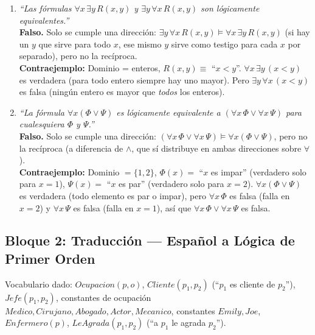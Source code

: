 \begin{enumerate}
    \item \textit{``Las fórmulas $\forall x\, \exists y\, R(x,y)$ y $\exists y\, \forall x\, R(x,y)$
    son lógicamente equivalentes.''}\\
    \textbf{Falso.} Solo se cumple una dirección: $\exists y\,\forall x\,R(x,y) \models \forall x\,
    \exists y\,R(x,y)$ (si hay un $y$ que sirve para todo $x$, ese mismo $y$ sirve como testigo para
    cada $x$ por separado), pero no la recíproca.\\
    \textbf{Contraejemplo:} Dominio = enteros, $R(x,y) \equiv$ ``$x<y$''. $\forall x\,\exists y\,
    (x<y)$ es verdadera (para todo entero siempre hay uno mayor). Pero $\exists y\,\forall x\,(x<y)$
    es falsa (ningún entero es mayor que \emph{todos} los enteros).

    \item \textit{``La fórmula $\forall x(\Phi \lor \Psi)$ es lógicamente equivalente a
    $(\forall x\,\Phi \lor \forall x\,\Psi)$ para cualesquiera $\Phi$ y $\Psi$.''}\\
    \textbf{Falso.} Solo se cumple una dirección: $(\forall x\,\Phi \lor \forall x\,\Psi) \models
    \forall x(\Phi\lor\Psi)$, pero no la recíproca (a diferencia de $\land$, que sí distribuye en
    ambas direcciones sobre $\forall$).\\
    \textbf{Contraejemplo:} Dominio $=\{1,2\}$, $\Phi(x)=$ ``$x$ es impar'' (verdadero solo para
    $x{=}1$), $\Psi(x)=$ ``$x$ es par'' (verdadero solo para $x{=}2$). $\forall x(\Phi\lor\Psi)$ es
    verdadera (todo elemento es par o impar), pero $\forall x\,\Phi$ es falsa (falla en $x{=}2$) y
    $\forall x\,\Psi$ es falsa (falla en $x{=}1$), así que $\forall x\,\Phi \lor \forall x\,\Psi$ es
    falsa.
\end{enumerate}

\subsection{Bloque 2: Traducción — Español a Lógica de Primer Orden}

Vocabulario dado: $Ocupacion(p,o)$, $Cliente(p_1,p_2)$ (``$p_1$ es cliente de $p_2$''),
$Jefe(p_1,p_2)$, constantes de ocupación $Medico, Cirujano, Abogado, Actor, Mecanico$, constantes
$Emily, Joe$, $Enfermero(p)$, $LeAgrada(p_1,p_2)$ (``a $p_1$ le agrada $p_2$'').

